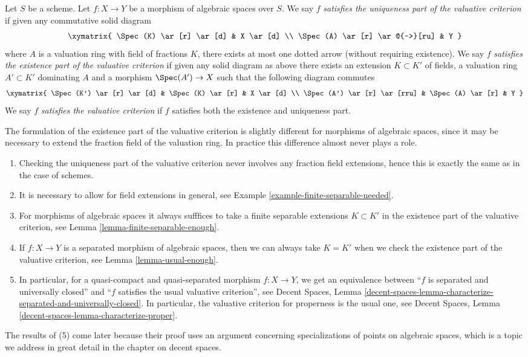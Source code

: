 \begin{definition}
\label{definition-valuative-criterion}
Let $S$ be a scheme.
Let $f : X \to Y$ be a morphism of algebraic spaces over $S$.
We say $f$ {\it satisfies the uniqueness part of the valuative criterion}
if given any commutative solid diagram
$$
\xymatrix{
\Spec(K) \ar[r] \ar[d] & X \ar[d] \\
\Spec(A) \ar[r] \ar@{-->}[ru] & Y
}
$$
where $A$ is a valuation ring with field of fractions $K$, there exists
at most one dotted arrow (without requiring existence).
We say $f$ {\it satisfies the existence part of the valuative criterion}
if given any solid diagram as above there exists an extension
$K \subset K'$ of fields, a valuation ring $A' \subset K'$ dominating
$A$ and a morphism $\Spec(A') \to X$ such that the following
diagram commutes
$$
\xymatrix{
\Spec(K') \ar[r] \ar[d] & \Spec(K) \ar[r] & X \ar[d] \\
\Spec(A') \ar[r] \ar[rru] & \Spec(A) \ar[r] & Y
}
$$
We say $f$ {\it satisfies the valuative criterion}
if $f$ satisfies both the existence and uniqueness part.
\end{definition}

\noindent
The formulation of the existence part of the valuative criterion is
slightly different for morphisms of algebraic spaces, since it may be
necessary to extend the fraction field of the valuation ring.
In practice this difference almost never plays a role.
\begin{enumerate}
\item Checking the uniqueness part of the valuative criterion never
involves any fraction field extensions, hence this is exactly the same
as in the case of schemes.
\item It is necessary to allow for field extensions in general, see
Example \ref{example-finite-separable-needed}.
\item For morphisms of algebraic spaces it always sufffices to
take a finite separable extensions $K \subset K'$ in the existence
part of the valuative criterion, see Lemma \ref{lemma-finite-separable-enough}.
\item If $f : X \to Y$ is a separated morphism of algebraic spaces, then
we can always take $K = K'$ when we check the existence part of the
valuative criterion, see Lemma \ref{lemma-usual-enough}.
\item In particular, for a quasi-compact and quasi-separated
morphism $f : X \to Y$, we get an equivalence between
``$f$ is separated and universally closed'' and ``$f$ satisfies
the usual valuative criterion'', see
Decent Spaces, Lemma
\ref{decent-spaces-lemma-characterize-separated-and-universally-closed}.
In particular, the valuative
criterion for properness is the usual one, see
Decent Spaces, Lemma \ref{decent-spaces-lemma-characterize-proper}.
\end{enumerate}
The results of (5) come later because their proof uses an argument concerning
specializations of points on algebraic spaces, which is a topic we address
in great detail in the chapter on decent spaces.

